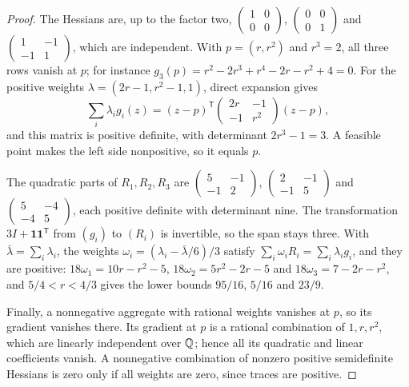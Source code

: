 \begin{proof}
The Hessians are, up to the factor two,
$\left(\begin{smallmatrix}1&0\\0&0\end{smallmatrix}\right)$,
$\left(\begin{smallmatrix}0&0\\0&1\end{smallmatrix}\right)$ and
$\left(\begin{smallmatrix}1&-1\\-1&1\end{smallmatrix}\right)$, which are
independent. With $p=(r,r^2)$ and $r^3=2$, all three rows vanish at $p$; for
instance $g_3(p)=r^2-2r^3+r^4-2r-r^2+4=0$. For the positive weights
$\lambda=(2r-1,r^2-1,1)$, direct expansion gives
\[
\sum_i\lambda_ig_i(z)=(z-p)^{\mathsf T}
\begin{pmatrix}2r&-1\\-1&r^2\end{pmatrix}(z-p),
\]
and this matrix is positive definite, with determinant $2r^3-1=3$. A feasible
point makes the left side nonpositive, so it equals $p$.

The quadratic parts of $R_1,R_2,R_3$ are
$\left(\begin{smallmatrix}5&-1\\-1&2\end{smallmatrix}\right)$,
$\left(\begin{smallmatrix}2&-1\\-1&5\end{smallmatrix}\right)$ and
$\left(\begin{smallmatrix}5&-4\\-4&5\end{smallmatrix}\right)$, each positive
definite with determinant nine. The transformation $3I+\mathbf1\mathbf1^{\mathsf
T}$ from $(g_i)$ to $(R_i)$ is invertible, so the span stays three. With
$\bar\lambda=\sum_i\lambda_i$, the weights $\omega_i=(\lambda_i-\bar\lambda/6)/3$ satisfy
$\sum_i\omega_iR_i=\sum_i\lambda_ig_i$, and they are positive:
$18\omega_1=10r-r^2-5$, $18\omega_2=5r^2-2r-5$ and $18\omega_3=7-2r-r^2$,
and $5/4<r<4/3$ gives the lower bounds $95/16$, $5/16$ and $23/9$.

Finally, a nonnegative aggregate with rational weights vanishes at $p$, so its
gradient vanishes there. Its gradient at $p$ is a rational combination of
$1,r,r^2$, which are linearly independent over $\mathbb Q$; hence all its quadratic
and linear coefficients vanish. A nonnegative combination of nonzero positive
semidefinite Hessians is zero only if all weights are zero, since traces are
positive.
\end{proof}

